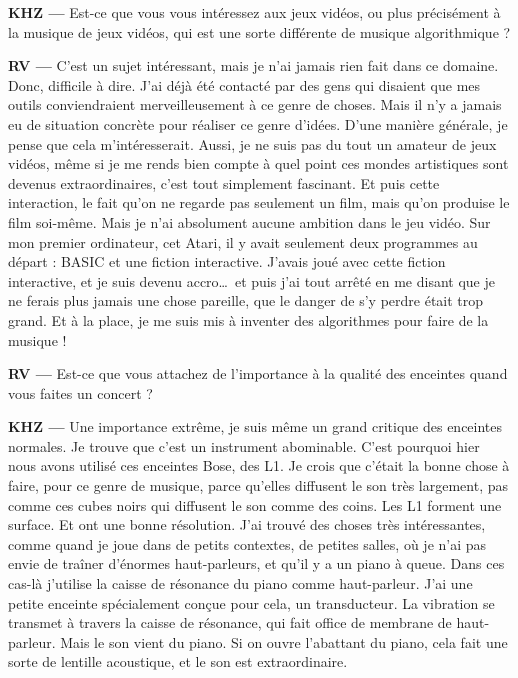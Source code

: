 \documentclass[a4paper,12pt]{article}
\begin{document}
\textbf{KHZ ---} Est-ce que vous vous intéressez aux jeux vidéos, ou plus précisément à la musique de jeux vidéos, qui est une sorte différente de musique algorithmique ?

\textbf{RV ---} C'est un sujet intéressant, mais je n'ai jamais rien fait dans ce domaine. Donc, difficile à dire. J'ai déjà été contacté par des gens qui disaient que mes outils conviendraient merveilleusement à ce genre de choses. Mais il n'y a jamais eu de situation concrète pour réaliser ce genre d'idées. D'une manière générale, je pense que cela m'intéresserait. Aussi, je ne suis pas du tout un amateur de jeux vidéos, même si je me rends bien compte à quel point ces mondes artistiques sont devenus extraordinaires, c'est tout simplement fascinant. Et puis cette interaction, le fait qu'on ne regarde pas seulement un film, mais qu'on produise le film soi-même. Mais je n'ai absolument aucune ambition dans le jeu vidéo. Sur mon premier ordinateur, cet Atari, il y avait seulement deux programmes au départ : BASIC et une fiction interactive. J'avais joué avec cette fiction interactive, et je suis devenu accro\dots~et puis j'ai tout arrêté en me disant que je ne ferais plus jamais une chose pareille, que le danger de s'y perdre était trop grand. Et à la place, je me suis mis à inventer des algorithmes pour faire de la musique !

\textbf{RV ---} Est-ce que vous attachez de l'importance à la qualité des enceintes quand vous faites un concert ?

\textbf{KHZ ---} Une importance extrême, je suis même un grand critique des enceintes normales. Je trouve que c'est un instrument abominable. C'est pourquoi hier nous avons utilisé ces enceintes Bose, des L1. Je crois que c'était la bonne chose à faire, pour ce genre de musique, parce qu'elles diffusent le son très largement, pas comme ces cubes noirs qui diffusent le son comme des coins. Les L1 forment une surface. Et ont une bonne résolution. J'ai trouvé des choses très intéressantes, comme quand je joue dans de petits contextes, de petites salles, où je n'ai pas envie de traîner d'énormes haut-parleurs, et qu'il y a un piano à queue. Dans ces cas-là j'utilise la caisse de résonance du piano comme haut-parleur. J’ai une petite enceinte spécialement conçue pour cela, un transducteur. La vibration se transmet à travers la caisse de résonance, qui fait office de membrane de haut-parleur. Mais le son vient du piano. Si on ouvre l'abattant du piano, cela fait une sorte de lentille acoustique, et le son est extraordinaire.
\end{document}
